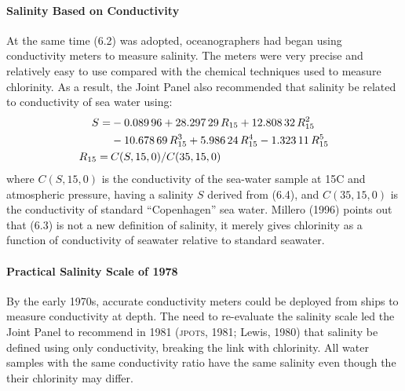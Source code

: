 \paragraph{Salinity Based on Conductivity}
At the same time (6.2) was adopted, ocean\-ographers had began using conductivity
meters to measure salinity. The meters were very precise and
relatively easy to use compared with the chemical techniques used to
measure chlorinity. As a result, the Joint Panel also recommended that
salinity be related to conductivity of sea water
using:
\begin{subequations}
\begin{align}
S  = &-0.089\,96 + 28.297\,29\,R_{15} + 12.808\,32\,R^2_{15} \notag \\
&-10.678\,69\,R^3_{15} + 5.986\,24\,R^4_{15} - 1.323\,11\,R^5_{15} \\
R_{15} = \: &C(S,15,0)/C(35,15,0)
\end{align}
\end{subequations}
where $C(S, 15, 0)$ is the conductivity of the sea-water sample at
15\degrees C and atmospheric pressure, having a salinity $S$ derived
from (6.4), and $C(35, 15, 0)$ is the conductivity of standard
``Copenhagen'' sea water. Millero (1996)
points out that (6.3) is not a new definition of salinity, it merely
gives chlorinity as a function of conductivity of seawater relative to
standard seawater.

\paragraph{Practical Salinity Scale of 1978}
By the early 1970s, accurate conductivity meters could be deployed
from ships to measure conductivity at depth. The need to re-evaluate
the salinity scale led the Joint Panel to recommend in 1981
(\textsc{jpots}, 1981; Lewis, 1980) that salinity be defined using
only conductivity, breaking the link with chlorinity. All water
samples with the same conductivity ratio have the same salinity even
though the their chlorinity may differ.

